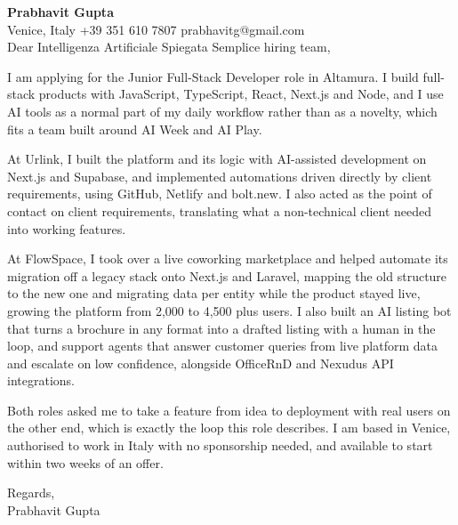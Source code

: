 \documentclass[a4paper,10.5pt]{article}
\begin{document}
\textbf{Prabhavit Gupta}\\
Venice, Italy \textbar{} +39 351 610 7807 \textbar{} prabhavitg@gmail.com\\[10pt]
Dear Intelligenza Artificiale Spiegata Semplice hiring team,

I am applying for the Junior Full-Stack Developer role in Altamura. I build full-stack products with JavaScript, TypeScript, React, Next.js and Node, and I use AI tools as a normal part of my daily workflow rather than as a novelty, which fits a team built around AI Week and AI Play.

At Urlink, I built the platform and its logic with AI-assisted development on Next.js and Supabase, and implemented automations driven directly by client requirements, using GitHub, Netlify and bolt.new. I also acted as the point of contact on client requirements, translating what a non-technical client needed into working features.

At FlowSpace, I took over a live coworking marketplace and helped automate its migration off a legacy stack onto Next.js and Laravel, mapping the old structure to the new one and migrating data per entity while the product stayed live, growing the platform from 2,000 to 4,500 plus users. I also built an AI listing bot that turns a brochure in any format into a drafted listing with a human in the loop, and support agents that answer customer queries from live platform data and escalate on low confidence, alongside OfficeRnD and Nexudus API integrations.

Both roles asked me to take a feature from idea to deployment with real users on the other end, which is exactly the loop this role describes. I am based in Venice, authorised to work in Italy with no sponsorship needed, and available to start within two weeks of an offer.

Regards,\\
Prabhavit Gupta
\end{document}
